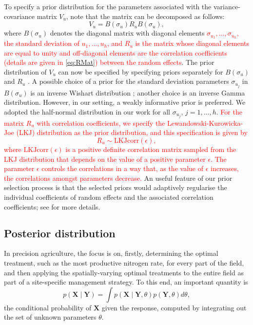 \documentclass[a4paper]{article}   	%
\begin{document}
	To specify a prior distribution for the parameters associated with the variance-covariance matrix $V_u$, note that the matrix can be decomposed as follows:
	\begin{equation}\label{eq:varmat}
		V_u = B(\sigma_u)R_u B(\sigma_u),
	\end{equation}
	where $B(\sigma_u)$ denotes the diagonal matrix with diagonal elements \textcolor{red}{$\sigma_{u_1},\ldots,\sigma_{u_h}$, the standard deviation of $u_1,\ldots,u_h$, and $R_u$ is the matrix whose diagonal elements are equal to unity and off-diagonal elements are the correlation coefficients (details are given in \eqref{eq:RMat}) between the random effects}. The prior distribution of $V_u$ can now be specified by specifying priors separately for $B(\sigma_u)$ and $R_u$ \parencite{McElreath2015Statistical}. A possible choice of a prior for the standard deviation parameters $\sigma_{u_j}$ in $B(\sigma_u)$ is an inverse Wishart distribution \parencite{Kass2006Default}; another choice is an inverse Gamma distribution. However, in our setting, a weakly informative prior is preferred. We adopted the half-normal distribution in our work for all $\sigma_{u_j}$, $j=1,\ldots,h$. \textcolor{red}{For the matrix $R_u$ with correlation coefficients, we specify the Lewandowski-Kurowicka-Joe (LKJ) distribution \parencite{Lewandowski2009Generating} as the prior distribution, and this specification is given by
	\begin{equation}\label{eq:RPrior}
		R_u \sim \text{LKJcorr}(\epsilon),
	\end{equation}
	where $\text{LKJcorr}(\epsilon)$ is a positive definite correlation matrix sampled from the LKJ distribution that depends on the value of a positive parameter $\epsilon$. The parameter $\epsilon$ controls the correlations in a way that, as the value of $\epsilon$ increases, the correlations amongst parameters decrease.} An useful feature of our prior selection process is that the selected priors would adaptively regularise the individual coefficients of random effects and the associated correlation coefficients; see \textcite{gelman2017Prior, gabry2019Visualization} for more details. 
	
	
	\subsection{Posterior distribution}
	
	In precision agriculture, the focus is on, firstly, determining the optimal treatment, such as the most productive nitrogen rate, for every part of the field, and then applying the spatially-varying optimal treatments to the entire field as part of a site-specific management strategy. To this end, an important quantity is 
	\begin{equation}
		p(\bm{X}\mid \bm{Y}) = \int p(\bm{X}\mid \bm{Y},\theta)p(\bm{Y},\theta)d\theta,
	\end{equation}
	the conditional probability of $\bm{X}$ given the response, computed by integrating out the set of unknown parameters $\theta$. 
	
\end{document}
